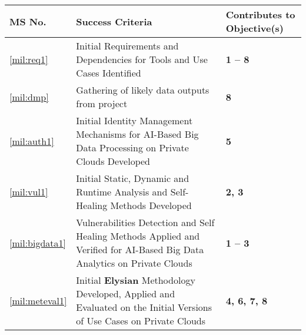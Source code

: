 \documentclass[a4paper,11pt]{article}
\newcommand{\project}[1]{\textbf{#1}\xspace}
\newcommand{\SECURITY}{\project{Elysian}}
\newcommand{\TheProject}{\SECURITY}
\begin{document}
\setcounter{ms}{0}
\vspace{20pt}
\begin{center}
\begin{tabular*}{\textwidth}{|p{1.2cm}|p{13.3cm}|p{2.2cm}|}\hline
\textbf{MS No.} & \textbf{Success Criteria} & \textbf{Contributes to
  Objective(s)} \\
  \hline
\ref{mil:req1} & Initial Requirements and Dependencies for Tools and Use Cases Identified & \textbf{1 -- 8} \\
  \hline
 \ref{mil:dmp} & Gathering of likely data outputs from project & \textbf{ 8} \\
  \hline
\ref{mil:auth1} & Initial Identity Management Mechanisms for AI-Based Big Data Processing on Private Clouds Developed & \textbf{5} \\
\hline
\ref{mil:vul1} & Initial Static, Dynamic and Runtime Analysis and Self-Healing Methods Developed & \textbf{2, 3} \\
\hline
\ref{mil:bigdata1} & Vulnerabilities Detection and Self Healing Methods Applied and Verified for AI-Based Big Data Analytics on Private Clouds & \textbf{1 -- 3} \\
\hline
\ref{mil:meteval1} & Initial \TheProject{} Methodology Developed, Applied and Evaluated on the Initial Versions of Use Cases on Private Clouds & \textbf{4, 6, 7, 8} \\


\end{tabular*}
\end{center}
\end{document}
